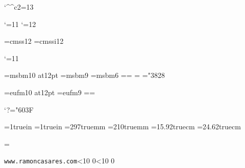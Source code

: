
\catcode`\^^c2=13
\ifx\index\undefined  \fi

\catcode`\@=11
\let\utf=\relax
\let\utf@Ch=\relax
\let\stringate=\relax
\let\dohigh=\relax
\let\doaccents=\relax
\let\dosymbols=\relax
\let\deactivate=\relax
\def\stringaccents{\def\'{\string\'}\def\~{\string\~}%
 \def\"{\string\"}\def\`{\string\`}\def\^{\string\^}}
\catcode`\@=12

\files


\ifx\loadfont\undefined  \fi
\xiifonts \xiititles \rm
\font\sf=cmss12
\font\sfit=cmssi12

\catcode`\@=11

\font\xiibb=msbm10 at12pt
\font\ixbb=msbm9
\font\vibb=msbm6
\newfam\bbfam %
\textfont\bbfam=\xiibb \scriptfont\bbfam=\ixbb
\scriptscriptfont\bbfam=\vibb
\def\bb{\fam\bbfam\xiibb}
\mathchardef\subsetneq="3828

\font\xiifrak=eufm10 at12pt
\font\ixfrak=eufm9
\newfam\frakfam \textfont\frakfam=\xiifrak \scriptfont\frakfam=\ixfrak
\def\frak{\fam\frakfam\xiifrak}

\mathcode`?="603F %
\def\ifmath$#1${\relax\ifmmode #1\else$#1$\fi}
\def\QED{\ifmath$\diamond$}


\ifcase\pdfoutput
\else
 \pdfhorigin=1truein
 \pdfvorigin=1truein
 \pdfpageheight=297truemm
 \pdfpagewidth=210truemm
\fi
\hsize=15.92truecm \vsize=24.62truecm %
\advance\vsize -30pt

\def\twodigits#1{\ifnum #1<10 0\fi \number#1}
\def\todayiso{\number\year \twodigits\month \twodigits\day}
\def\Folio{\ifnum\pageno<0
 \uppercase\expandafter{\romannumeral-\pageno}\else\number\pageno\fi}

\headline={\strut{\tt www.ramoncasares.com}\quad \todayiso \hfil
 \quad{\bf \jobname}\quad {\bf\Folio}}%
\def\makeheadline{\vbox to 30pt{\line{\the\headline}%
  \kern 1pt \hrule height 1pt\vfil}\nointerlineskip}
\nopagenumbers


\newcount\secno
\newcount\ssecno
\newcount\thno
\newcount\parno
\let\presec=\empty

\parskip=0pt
\newdimen\oldparindent \oldparindent=20pt \parindent=0pt
\def\hang{\hangindent\oldparindent}

